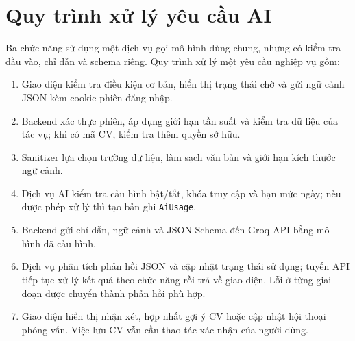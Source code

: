 \section{Quy trình xử lý yêu cầu AI}

Ba chức năng sử dụng một dịch vụ gọi mô hình dùng chung, nhưng có kiểm tra đầu vào, chỉ dẫn và schema riêng. Quy trình xử lý một yêu cầu nghiệp vụ gồm:

\begin{enumerate}
    \item Giao diện kiểm tra điều kiện cơ bản, hiển thị trạng thái chờ và gửi ngữ cảnh JSON kèm cookie phiên đăng nhập.
    \item Backend xác thực phiên, áp dụng giới hạn tần suất và kiểm tra dữ liệu của tác vụ; khi có mã CV, kiểm tra thêm quyền sở hữu.
    \item Sanitizer lựa chọn trường dữ liệu, làm sạch văn bản và giới hạn kích thước ngữ cảnh.
    \item Dịch vụ AI kiểm tra cấu hình bật/tắt, khóa truy cập và hạn mức ngày; nếu được phép xử lý thì tạo bản ghi \texttt{AiUsage}.
    \item Backend gửi chỉ dẫn, ngữ cảnh và JSON Schema đến Groq API bằng mô hình đã cấu hình.
    \item Dịch vụ phân tích phản hồi JSON và cập nhật trạng thái sử dụng; tuyến API tiếp tục xử lý kết quả theo chức năng rồi trả về giao diện. Lỗi ở từng giai đoạn được chuyển thành phản hồi phù hợp.
    \item Giao diện hiển thị nhận xét, hợp nhất gợi ý CV hoặc cập nhật hội thoại phỏng vấn. Việc lưu CV vẫn cần thao tác xác nhận của người dùng.
\end{enumerate}


